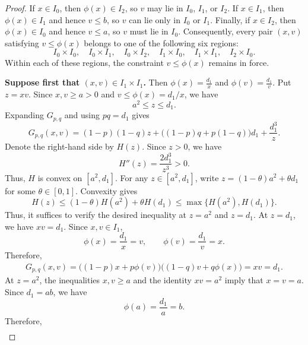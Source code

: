 \documentclass[11pt]{article}
\numberwithin{equation}{section}
\theoremstyle{definition}
\theoremstyle{remark}
\begin{document}
\begin{proof}
If $x\in I_0$, then $\phi(x)\in I_2$, so $v$ may lie in $I_0$,
$I_1$, or $I_2$. If $x\in I_1$, then $\phi(x)\in I_1$ and hence
$v\leq b$, so $v$ can lie only in $I_0$ or $I_1$. Finally, if
$x\in I_2$, then $\phi(x)\in I_0$ and hence $v\leq a$, so
$v$ must lie in $I_0$.
Consequently, every pair $(x,v)$ satisfying $v\leq\phi(x)$ belongs to
one of the following six regions:
\begin{equation*}
 I_0\times I_0,\quad
 I_0\times I_1,\quad
 I_0\times I_2,\quad
 I_1\times I_0,\quad
 I_1\times I_1,\quad
 I_2\times I_0.
\end{equation*}
Within each of these regions, the constraint $v\leq\phi(x)$ remains in
force.


\textbf{Suppose first that $(x,v)\in I_1\times I_1$.} Then
$
 \phi(x)=\frac{d_1}{x}
$
and 
$
 \phi(v)=\frac{d_1}{v}.
$
Put $z=xv$. Since $x,v\geq a>0$ and $v\leq \phi(x)=d_1/x$, we have
\begin{equation*}
 a^2\leq z\leq d_1.
\end{equation*}
Expanding $G_{p,q}$ and using $pq=d_1$ gives
\begin{equation*}
 G_{p,q}(x,v)
 =
 (1-p)(1-q)z
 +
 \bigl((1-p)q+p(1-q)\bigr)d_1
 +
 \frac{d_1^3}{z}.
\end{equation*}
Denote the right-hand side by
$
 H(z).
$
Since $z>0$, we have
\begin{equation*}
 H''(z)=\frac{2d_1^3}{z^3}>0.
\end{equation*}
Thus, $H$ is convex on $[a^2,d_1]$. For any
$z\in[a^2,d_1]$, write
$
 z=(1-\theta)a^2+\theta d_1
$
for some $\theta\in[0,1]$. Convexity gives
\begin{equation*}
 H(z)
 \leq
 (1-\theta)H(a^2)+\theta H(d_1)
 \leq
 \max\{H(a^2),H(d_1)\}.
\end{equation*}
Thus, it suffices to verify the desired inequality at
$z=a^2$ and $z=d_1$. 
At $z=d_1$, we have $xv=d_1$. Since $x,v\in I_1$,
\begin{equation*}
 \phi(x)=\frac{d_1}{x}=v,
 \qquad
 \phi(v)=\frac{d_1}{v}=x.
\end{equation*}
Therefore,
\begin{align*}
 G_{p,q}(x,v)
 =
 \bigl((1-p)x+p\phi(v)\bigr)
 \bigl((1-q)v+q\phi(x)\bigr)=xv=d_1.
\end{align*} At $z=a^2$, the inequalities $x,v\geq a$ and the identity
$xv=a^2$ imply that $x=v=a$. Since $d_1=ab$, we have
\begin{equation*}
 \phi(a)=\frac{d_1}{a}=b.
\end{equation*}
Therefore,
\begin{align*}

\end{align*}
\end{proof}
\end{document}
